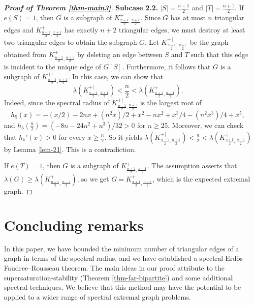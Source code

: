 \documentclass[11pt]{article}
\begin{document}
\begin{proof}[{\bf Proof of Theorem \ref{thm-main3}}]
\medskip 
{\bf Subcase 2.2.}  $|S|= \frac{n-1}{2} $ and $|T|=\frac{n+1}{2}$. 
If $e(S)=1$, then $G$ is a subgraph of $K_{\frac{n-1}{2} , \frac{n+1}{2} }^+$. Since $G$ has at most $n$ triangular edges and $K_{\frac{n-1}{2} , \frac{n+1}{2} }^+$ has exactly $n+2$ triangular edges, 
we must destroy at least 
two triangular edges to obtain the subgraph $G$. 
Let $K_{\frac{n-1}{2} , \frac{n+1}{2} }^{+\,|}$ 
be the graph obtained from 
$K_{\frac{n-1}{2} , \frac{n+1}{2} }^+$ by deleting an edge between $S$ and $T$ such that this edge is incident to 
the unique edge of $G[S]$. 
Furthermore, it follows that 
$G$ is a subgraph of $K_{\frac{n-1}{2} , \frac{n+1}{2} }^{+\,|}$.  
In this case, we can show that 
\[  \lambda (K_{\frac{n-1}{2} , \frac{n+1}{2} }^{+\, |}) < \frac{n}{2} 
< \lambda (K_{\frac{n+1}{2} , \frac{n-1}{2} }^{+}) .  \]
Indeed, since the spectral radius of $K_{\frac{n-1}{2} , \frac{n+1}{2} }^{+\, |}$ 
is the largest root of 
\[ h_5(x) = -(x/2) - 2 n x + (n^2 x)/2 + x^2 - n x^2 + x^3/4 - (n^2 x^3)/4 + x^5,  \]
and $h_5(\frac{n}{2})=  (-8 n - 24 n^2 + n^3)/32 >0$
for $n\ge 25$. Moreover, we can check that 
$h_5'(x) >0$ for every $x\ge \frac{n}{2}$. So it yields 
$\lambda (K_{\frac{n-1}{2} , \frac{n+1}{2} }^{+\, |}) < \frac{n}{2} < 
 \lambda (K_{\frac{n+1}{2} , \frac{n-1}{2} }^{+})$ by Lemma \ref{lem-21}.  
This is a contradiction. 

If $e(T)=1$, then $G$ is a subgraph of $K_{\frac{n+1}{2} , \frac{n-1}{2} }^+$. The assumption asserts that $\lambda (G) 
\ge \lambda (K_{\frac{n+1}{2} , \frac{n-1}{2} }^+)$, 
so we get $G=K_{\frac{n+1}{2} , \frac{n-1}{2} }^+$, 
which is the expected extremal graph. 
\end{proof}







\section{Concluding remarks}

\label{sec7}

In this paper, 
we have bounded the minimum number of triangular edges 
of a graph in terms of the spectral radius, 
and we have established a spectral Erd\H{o}s--Faudree--Rousseau theorem. 
The main ideas in our proof 
attribute to the supersaturation-stability (Theorem \ref{thm-far-bipartite}) and some additional spectral techniques. 
We believe that this method may have the potential to be applied to a wider range of spectral extremal graph problems. 
\end{document}
